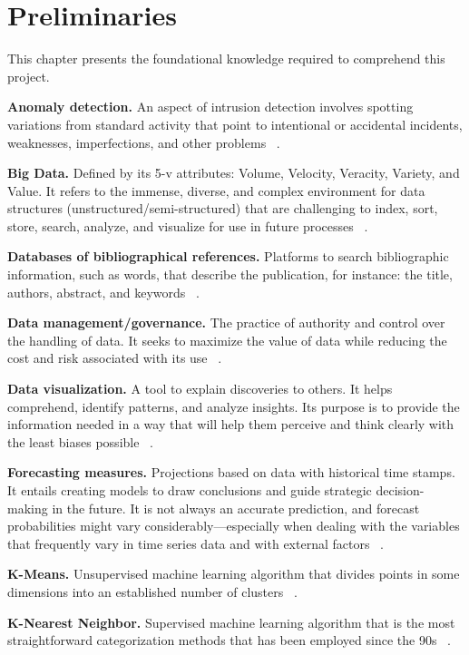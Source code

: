 \documentclass[a4paper,12pt,twoside]{ThesisStyle}
\begin{document}
\chapter{Preliminaries}
\label{cap:prelim}

This chapter presents the foundational knowledge required to comprehend this project.

\textbf{Anomaly detection.} An aspect of intrusion detection involves spotting variations from standard activity that point to intentional or accidental incidents, weaknesses, imperfections, and other problems ~\cite{omar2013machine}.

\textbf{Big Data.} Defined by its 5-v attributes: Volume, Velocity, Veracity, Variety, and Value. It refers to the immense, diverse, and complex environment for data structures (unstructured/semi-structured) that are challenging to index, sort, store, search, analyze, and visualize for use in future processes ~\cite{naeem2022trends}.

\textbf{Databases of bibliographical references.} Platforms to search bibliographic information, such as words, that describe the publication, for instance: the title, authors, abstract, and keywords ~\cite{Lund2023}. 

\textbf{Data management/governance.} The practice of authority and control over the handling of data. It seeks to maximize the value of data while reducing the cost and risk associated with its use ~\cite{abraham2019data}. 

\textbf{Data visualization.} A tool to explain discoveries to others. It helps comprehend, identify patterns, and analyze insights. Its purpose is to provide the information needed in a way that will help them perceive and think clearly with the least biases possible ~\cite{andrienko2020big}. 

\textbf{Forecasting measures.} Projections based on data with historical time stamps. It entails creating models to draw conclusions and guide strategic decision-making in the future. It is not always an accurate prediction, and forecast probabilities might vary considerably—especially when dealing with the variables that frequently vary in time series data and with external factors ~\cite{Tableau2023}.  

\textbf{K-Means.} Unsupervised machine learning algorithm that divides points in some dimensions into an established number of clusters ~\cite{hartigan1979algorithm}.

\textbf{K-Nearest Neighbor.} Supervised machine learning algorithm that is the most straightforward categorization methods that has been employed since the 90s ~\cite{laaksonen1996classification}.
\end{document}
